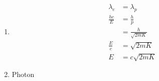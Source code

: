 \documentclass{article}
\begin{document}
\begin{enumerate}
  \item

        \begin{align*}
          \lambda_e     & = \lambda_p              \\
          \frac{h c}{E} & = \frac{h}{p}            \\
                        & = \frac{h}{\sqrt{2 m K}} \\
          \frac{E}{c}   & = \sqrt{2 m K}           \\
          E             & = c \sqrt{2 m K}
        \end{align*}

  \item Photon
\end{enumerate}

\setcounter{subsubsection}{68}
\subsubsection{}
\end{document}
